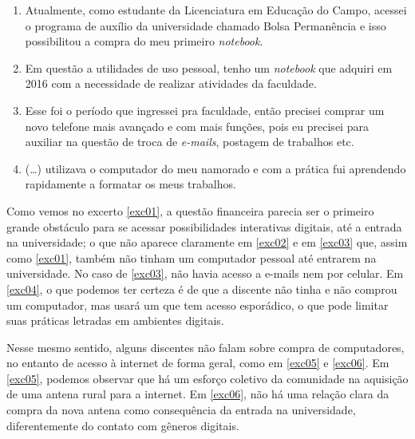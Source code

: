 \documentclass{textolivre}
\begin{document}
\begin{enumerate}[label={(\arabic*)},ref={\arabic*},topsep=1ex,partopsep=1ex]
    \item\label{exc01} Atualmente, como estudante da Licenciatura em Educação do Campo, acessei o programa de auxílio da universidade chamado Bolsa Permanência e isso possibilitou a compra do meu primeiro \textit{notebook}.
    \item\label{exc02} Em questão a utilidades de uso pessoal, tenho um \textit{notebook} que adquiri em 2016  com a necessidade de realizar atividades da faculdade.
    \item\label{exc03} Esse foi o período que ingressei pra faculdade, então precisei comprar um novo telefone mais avançado e com mais funções, pois eu precisei para auxiliar na  questão de troca de \textit{e-mails}, postagem de trabalhos etc.
    \item\label{exc04} (\ldots) utilizava o computador do meu namorado e com a prática fui aprendendo rapidamente a formatar os meus trabalhos.
\end{enumerate}


Como vemos no excerto \ref{exc01}, a questão financeira parecia ser o primeiro grande obstáculo para se acessar possibilidades interativas digitais, até a entrada na universidade; o que não aparece claramente em \ref{exc02} e em \ref{exc03} que, assim como \ref{exc01}, também não tinham um computador pessoal até entrarem na universidade. No caso de \ref{exc03}, não havia acesso a e-mails nem por celular. Em \ref{exc04}, o que podemos ter certeza é de que a discente não tinha e não comprou um computador, mas usará um que tem acesso esporádico, o que pode limitar suas práticas letradas em ambientes digitais.

Nesse mesmo sentido, alguns discentes não falam sobre compra de computadores, no entanto de acesso à internet de forma geral, como em \ref{exc05} e \ref{exc06}. Em \ref{exc05}, podemos observar que há um esforço coletivo da comunidade na aquisição de uma antena rural para a internet. Em \ref{exc06}, não há uma relação clara da compra da nova antena como consequência da entrada na universidade, diferentemente do contato com gêneros digitais.
\end{document}
